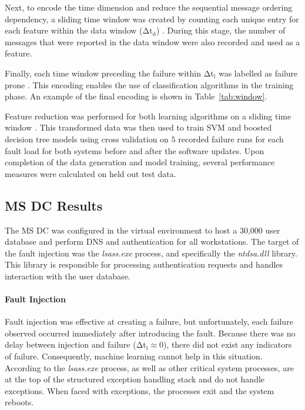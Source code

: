 Next, to encode the time dimension and reduce the sequential message ordering
dependency, a sliding time window was created by counting each unique entry for
each feature within the data window ($\mathrm{\Delta t_d}$)
\citep{vaarandi2002}.  During this stage, the number of messages that were
reported in the data window were also recorded and used as a feature.

Finally, each time window preceding the failure within $\mathrm{\Delta t_l}$
was labelled as failure prone \citep{irrera2015}.  This encoding enables the
use of classification algorithms in the training phase.  An example of the
final encoding is shown in Table~\ref{tab:window}.

\tabMessageIDs %
\tabSlidingWindow

Feature reduction was performed for both learning algorithms on a sliding time
window \citep{fulp2008,irrera2013a,vaarandi2002}.  This transformed data was
then used to train \ac{SVM} and boosted decision tree models using cross
validation on $5$ recorded failure runs for each fault load for both systems
before and after the software updates.  Upon completion of the data generation
and model training, several performance measures were calculated on held out
test data.

\subsection{\acrfull{MS} \acrfull{DC} Results}
The \ac{MS} \ac{DC} was configured in the virtual environment to host a
30,000 user database and perform \ac{DNS} and authentication for all
workstations.  The target of the fault injection was the \emph{lsass.exe}
process, and specifically the \emph{ntdsa.dll} library.  This library is
responsible for processing authentication requests and handles interaction with
the user database.

\paragraph{Fault Injection}
Fault injection was effective at creating a failure, but unfortunately, each
failure observed occurred immediately after introducing the fault.  Because
there was no delay between injection and failure ($\mathrm{\Delta t_l \approx
0}$), there did not exist any indicators of failure.  Consequently, machine
learning cannot help in this situation.  According to \citet{russinovich2009}
the \emph{lsass.exe} process, as well as other critical system processes, are
at the top of the structured exception handling stack and do not handle
exceptions.  When faced with exceptions, the processes exit and the system
reboots.

